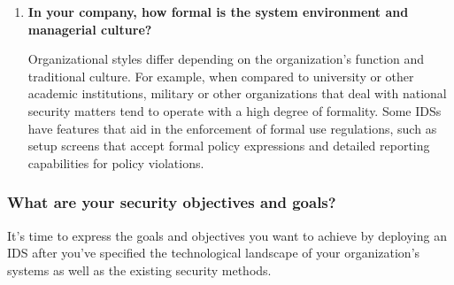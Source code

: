 \documentclass[12pt]{article}
\begin{document}
\begin{enumerate}
        \item \textbf{In your company, how formal is the system environment and managerial culture?}
        \par Organizational styles differ depending on the organization's function and traditional culture. For example, when compared to university or other academic institutions, military or other organizations that deal with national security matters tend to operate with a high degree of formality. Some IDSs have features that aid in the enforcement of formal use regulations, such as setup screens that accept formal policy expressions and detailed reporting capabilities for policy violations.
        
    \end{enumerate}
    
    \subsubsection{What are your security objectives and goals?}
    \par It's time to express the goals and objectives you want to achieve by deploying an IDS after you've specified the technological landscape of your organization's systems as well as the existing security methods.
    
\end{document}
